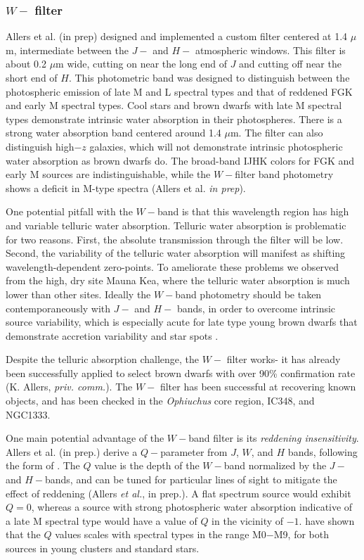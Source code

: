 \subsubsection{$W-$ filter}
Allers et al. (in prep) designed and implemented a custom filter centered at 1.4 $\mu$m, intermediate between the $J-$ and $H-$ atmospheric windows.  This filter is about 0.2 $\mu$m wide, cutting on near the long end of $J$ and cutting off near the short end of $H$.  This photometric band was designed to distinguish between the photospheric emission of late M and L spectral types and that of reddened FGK and early M spectral types.  Cool stars and brown dwarfs with late M spectral types demonstrate intrinsic water absorption in their photospheres.  There is a strong water absorption band centered around 1.4 $\mu$m.  The filter can also distinguish high$-z$ galaxies, which will not demonstrate intrinsic photospheric water absorption as brown dwarfs do.  The broad-band IJHK colors for FGK and early M sources are indistinguishable, while the $W-$filter band photometry shows a deficit in M-type spectra (Allers et al. \emph{in prep}).

One potential pitfall with the $W-$band is that this wavelength region has high and variable telluric water absorption.  Telluric water absorption is problematic for two reasons.  First, the absolute transmission through the filter will be low.  Second, the variability of the telluric water absorption will manifest as shifting wavelength-dependent zero-points. To ameliorate these problems we observed from the high, dry site Mauna Kea, where the telluric water absorption is much lower than other sites.  Ideally the $W-$band photometry should be taken contemporaneously with $J-$ and $H-$ bands, in order to overcome intrinsic source variability, which is especially acute for late type young brown dwarfs that demonstrate accretion variability and star spots \citep{2008A&A...485..155A,2014AJ....147...82C}.

Despite the telluric absorption challenge, the $W-$ filter works- it has already been successfully applied to select brown dwarfs with over 90\% confirmation rate (K. Allers, \emph{priv. comm.}).  The $W-$ filter has been successful at recovering known objects, and has been checked in the \emph{Ophiuchus} core region, IC348, and NGC1333.

One main potential advantage of the $W-$band filter is its \emph{reddening insensitivity}.  Allers et al. (in prep.) derive a $Q-$parameter from $J$, $W$, and $H$ bands, following the form of \citet{2000ApJ...541..977N}.  The $Q$ value is the depth of the $W-$band normalized by the $J-$ and $H-$bands, and can be tuned for particular lines of sight to mitigate the effect of reddening (Allers \emph{et al.}, in prep.).  A flat spectrum source would exhibit $Q=0$, whereas a source with strong photospheric water absorption indicative of a late M spectral type would have a value of $Q$ in the vicinity of $-1$.  \citet{2000ApJ...541..977N} have shown that the $Q$ values scales with spectral types in the range M0$-$M9, for both sources in young clusters and standard stars.  

